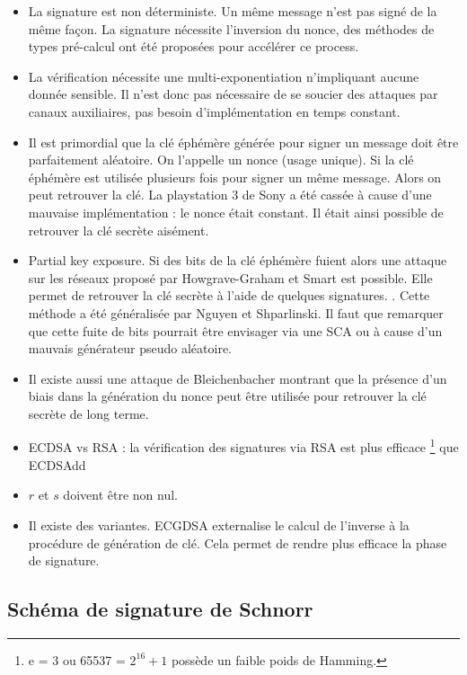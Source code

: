 \begin{itemize}[label=$\bullet$]
    \item La signature est non déterministe. Un même message n'est pas signé de la même façon. La signature nécessite l'inversion du nonce, des méthodes de types pré-calcul ont été proposées pour accélérer ce process.
    \item La vérification nécessite une multi-exponentiation n'impliquant aucune donnée sensible. Il n'est donc pas nécessaire de se soucier des attaques par canaux auxiliaires, pas besoin d'implémentation en temps constant. 
    \item Il est primordial que la clé éphémère générée pour signer un message doit être parfaitement aléatoire. On l'appelle un nonce (usage unique). Si la clé éphémère est utilisée plusieurs fois pour signer un même message. Alors on peut retrouver la clé. La playstation 3 de Sony a été cassée à cause d'une mauvaise implémentation : le nonce était constant. Il était ainsi possible de retrouver la clé secrète aisément.
    \item Partial key exposure. Si des bits de la clé éphémère fuient alors une attaque sur les réseaux proposé par Howgrave-Graham et Smart est possible. Elle permet de retrouver la clé secrète à l'aide de quelques signatures. . Cette méthode a été généralisée par Nguyen et Shparlinski. Il faut que remarquer que cette fuite de bits pourrait être envisager via une SCA ou à cause d'un mauvais générateur pseudo aléatoire.
    \item Il existe aussi une attaque de Bleichenbacher montrant que la présence d'un biais dans la génération du nonce peut être utilisée pour retrouver la clé secrète de long terme.
    \item ECDSA vs RSA : la vérification des signatures via RSA est plus efficace \footnote{e = 3 ou 65537 = $2^{16} + 1$ possède un faible poids de Hamming.} que ECDSAdd
    \item $r$ et $s$ doivent être non nul.
    \item Il existe des variantes. ECGDSA  externalise le calcul de l'inverse à la procédure de génération de clé. Cela permet de rendre plus efficace la phase de signature.
\end{itemize}


\subsection{Schéma de signature de Schnorr}

